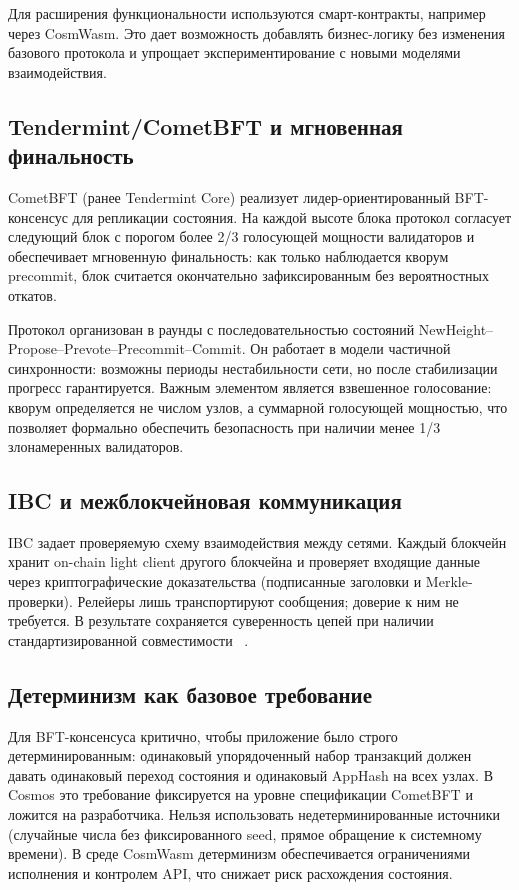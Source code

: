 Для расширения функциональности используются смарт-контракты, например через
CosmWasm. Это дает возможность добавлять бизнес-логику без изменения базового
протокола и упрощает экспериментирование с новыми моделями взаимодействия.

\subsection{Tendermint/CometBFT и мгновенная финальность}\label{sec:ch2/sec1/tendermint}

CometBFT (ранее Tendermint Core) реализует лидер-ориентированный BFT-консенсус для
репликации состояния. На каждой высоте блока протокол согласует следующий блок с
порогом более 2/3 голосующей мощности валидаторов и обеспечивает мгновенную
финальность: как только наблюдается кворум precommit, блок считается окончательно
зафиксированным без вероятностных откатов.

Протокол организован в раунды с последовательностью состояний
NewHeight--Propose--Prevote--Precommit--Commit. Он работает в модели частичной
синхронности: возможны периоды нестабильности сети, но после стабилизации
прогресс гарантируется. Важным элементом является взвешенное голосование:
кворум определяется не числом узлов, а суммарной голосующей мощностью, что
позволяет формально обеспечить безопасность при наличии менее 1/3
злонамеренных валидаторов.

\subsection{IBC и межблокчейновая коммуникация}\label{sec:ch2/sec1/ibc}

IBC задает проверяемую схему взаимодействия между сетями. Каждый блокчейн хранит
on-chain light client другого блокчейна и проверяет входящие данные через
криптографические доказательства (подписанные заголовки и Merkle-проверки).
Релейеры лишь транспортируют сообщения; доверие к ним не требуется. В результате
сохраняется суверенность цепей при наличии стандартизированной совместимости
~\cite{Goes2020}.

\subsection{Детерминизм как базовое требование}\label{sec:ch2/sec1/determinism}

Для BFT-консенсуса критично, чтобы приложение было строго детерминированным:
одинаковый упорядоченный набор транзакций должен давать одинаковый переход
состояния и одинаковый AppHash на всех узлах. В Cosmos это требование фиксируется
на уровне спецификации CometBFT и ложится на разработчика. Нельзя использовать
недетерминированные источники (случайные числа без фиксированного seed, прямое
обращение к системному времени). В среде CosmWasm детерминизм обеспечивается
ограничениями исполнения и контролем API, что снижает риск расхождения состояния.

